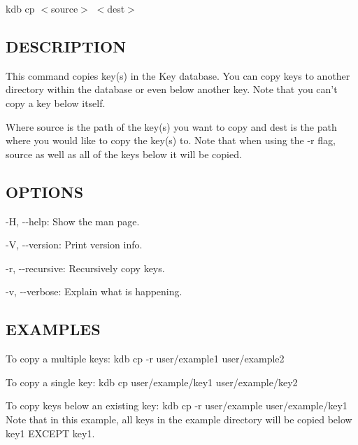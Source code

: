 {\ttfamily kdb cp $<$source$>$ $<$dest$>$}

\subsection*{D\+E\+S\+C\+R\+I\+P\+T\+I\+O\+N}

This command copies key(s) in the Key database. You can copy keys to another directory within the database or even below another key. Note that you can't copy a key below itself.

Where {\ttfamily source} is the path of the key(s) you want to copy and {\ttfamily dest} is the path where you would like to copy the key(s) to. Note that when using the {\ttfamily -\/r} flag, {\ttfamily source} as well as all of the keys below it will be copied.

\subsection*{O\+P\+T\+I\+O\+N\+S}


\begin{DoxyItemize}
\item {\ttfamily -\/\+H}, {\ttfamily -\/-\/help}\+: Show the man page.
\item {\ttfamily -\/\+V}, {\ttfamily -\/-\/version}\+: Print version info.
\item {\ttfamily -\/r}, {\ttfamily -\/-\/recursive}\+: Recursively copy keys.
\item {\ttfamily -\/v}, {\ttfamily -\/-\/verbose}\+: Explain what is happening.
\end{DoxyItemize}

\subsection*{E\+X\+A\+M\+P\+L\+E\+S}

To copy a multiple keys\+: {\ttfamily kdb cp -\/r user/example1 user/example2}

To copy a single key\+: {\ttfamily kdb cp user/example/key1 user/example/key2}

To copy keys below an existing key\+: {\ttfamily kdb cp -\/r user/example user/example/key1} Note that in this example, all keys in the example directory will be copied below {\ttfamily key1} E\+X\+C\+E\+P\+T {\ttfamily key1}. 